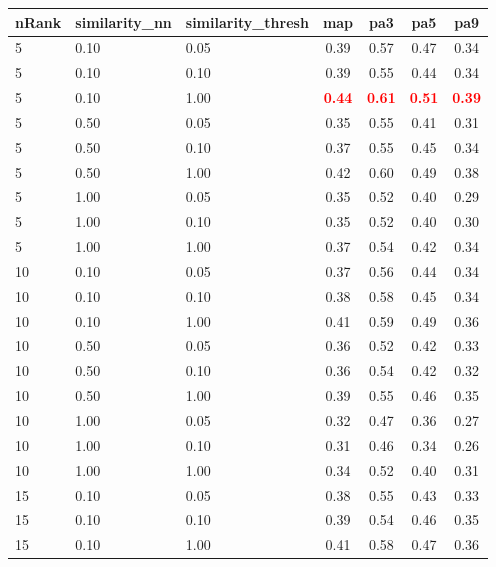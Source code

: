 \documentclass[12pt,a4paper,fleqn]{tufte-handout}
\begin{document}
 
\begin{table}               
\begin{center}               
\scriptsize               
\setlength{\tabcolsep}{.16667em}               
\begin{tabular}{lllcccc}               
nRank & similarity\_nn & similarity\_thresh & map & pa3 & pa5 & pa9 \\               
\hline               
5 & 0.10 & 0.05 & 0.39 & 0.57 & 0.47 & 0.34 \\               
5 & 0.10 & 0.10 & 0.39 & 0.55 & 0.44 & 0.34 \\               
5 & 0.10 & 1.00 & \textbf{\textcolor{red}{0.44}} & \textbf{\textcolor{red}{0.61}} & \textbf{\textcolor{red}{0.51}} & \textbf{\textcolor{red}{0.39}} \\               
5 & 0.50 & 0.05 & 0.35 & 0.55 & 0.41 & 0.31 \\               
5 & 0.50 & 0.10 & 0.37 & 0.55 & 0.45 & 0.34 \\               
5 & 0.50 & 1.00 & 0.42 & 0.60 & 0.49 & 0.38 \\               
5 & 1.00 & 0.05 & 0.35 & 0.52 & 0.40 & 0.29 \\               
5 & 1.00 & 0.10 & 0.35 & 0.52 & 0.40 & 0.30 \\               
5 & 1.00 & 1.00 & 0.37 & 0.54 & 0.42 & 0.34 \\               
10 & 0.10 & 0.05 & 0.37 & 0.56 & 0.44 & 0.34 \\               
10 & 0.10 & 0.10 & 0.38 & 0.58 & 0.45 & 0.34 \\               
10 & 0.10 & 1.00 & 0.41 & 0.59 & 0.49 & 0.36 \\               
10 & 0.50 & 0.05 & 0.36 & 0.52 & 0.42 & 0.33 \\               
10 & 0.50 & 0.10 & 0.36 & 0.54 & 0.42 & 0.32 \\               
10 & 0.50 & 1.00 & 0.39 & 0.55 & 0.46 & 0.35 \\               
10 & 1.00 & 0.05 & 0.32 & 0.47 & 0.36 & 0.27 \\               
10 & 1.00 & 0.10 & 0.31 & 0.46 & 0.34 & 0.26 \\               
10 & 1.00 & 1.00 & 0.34 & 0.52 & 0.40 & 0.31 \\               
15 & 0.10 & 0.05 & 0.38 & 0.55 & 0.43 & 0.33 \\               
15 & 0.10 & 0.10 & 0.39 & 0.54 & 0.46 & 0.35 \\               
15 & 0.10 & 1.00 & 0.41 & 0.58 & 0.47 & 0.36 \\               

\end{tabular}
\end{center}
\end{table}
\end{document}
